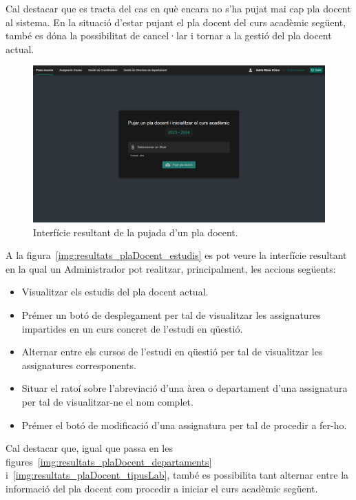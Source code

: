 \documentclass[a4paper,12pt]{ThesisStyle}
\begin{document}
Cal destacar que es tracta del cas en què encara no s'ha pujat mai cap pla docent al sistema. En la situació d'estar pujant el pla docent del curs acadèmic següent, també es dóna la possibilitat de cancel·lar i tornar a la gestió del pla docent actual.

\begin{figure}[H]
  \centering
  \includegraphics[width=\textwidth]{assets/results/plaDocent/pujada.png}
  \caption{\label{img:resultats_plaDocent_pujada}Interfície resultant de la pujada d'un pla docent.}
\end{figure}

\newpage

A la figura~\ref{img:resultats_plaDocent_estudis} es pot veure la interfície resultant en la qual un Administrador pot realitzar, principalment, les accions següents:
\begin{itemize}
  \item Visualitzar els estudis del pla docent actual.
  \item Prémer un botó de desplegament per tal de visualitzar les assignatures impartides en un curs concret de l'estudi en qüestió.
  \item Alternar entre els cursos de l'estudi en qüestió per tal de visualitzar les assignatures corresponents.
  \item Situar el ratoí sobre l'abreviació d'una àrea o departament d'una assignatura per tal de visualitzar-ne el nom complet.
  \item Prémer el botó de modificació d'una assignatura per tal de procedir a fer-ho.
\end{itemize}

Cal destacar que, igual que passa en les figures~\ref{img:resultats_plaDocent_departaments} i~\ref{img:resultats_plaDocent_tipusLab}, també es possibilita tant alternar entre la informació del pla docent com procedir a iniciar el curs acadèmic següent.
\end{document}

